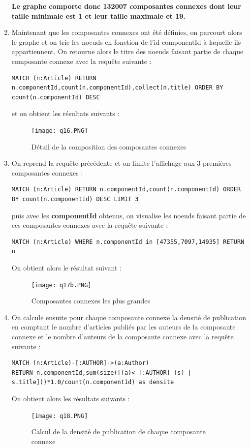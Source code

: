 \documentclass[11pt]{article}
\begin{document}
\begin{enumerate}[resume]
\textbf{Le graphe comporte donc 132007 composantes connexes dont leur taille minimale est 1 et leur taille maximale et 19.}
\item 
Maintenant que les composantes connexes ont été définies, on parcourt alors le graphe et on trie les noeuds en fonction de l'id componentId à laquelle ils appartiennent. On retourne alors le titre des noeuds faisant partie de chaque composante connexe avec la requête suivante :
\begin{lstlisting}
MATCH (n:Article) RETURN n.componentId,count(n.componentId),collect(n.title) ORDER BY count(n.componentId) DESC
\end{lstlisting}
et on obtient les résultats suivants :
\begin{figure}[H]
    \centerline{\texttt{[image: q16.PNG]}}
    \caption{Détail de la composition des composantes connexes}
\end{figure}
\item 
On reprend la requête précédente et on limite l'affichage aux 3 premières composantes connexes :
\begin{lstlisting}
MATCH (n:Article) RETURN n.componentId,count(n.componentId) ORDER BY count(n.componentId) DESC LIMIT 3
\end{lstlisting}
puis avec les \textbf{componentId} obtenus, on visualise les noeuds faisant partie de ces composantes connexes avec la requête suivante :
\begin{lstlisting}
MATCH (n:Article) WHERE n.componentId in [47355,7097,14935] RETURN n
\end{lstlisting}
On obtient alors le résultat suivant :
\begin{figure}[H]
    \centerline{\texttt{[image: q17b.PNG]}}
    \caption{Composantes connexes les plus grandes}
\end{figure}
\item 
On calcule ensuite pour chaque composante connexe la densité de publication en comptant le nombre d'articles publiés par les auteurs de la composante connexe et le nombre d'auteurs de la composante connexe avec la requête suivante :
\begin{lstlisting}
MATCH (n:Article)-[:AUTHOR]->(a:Author) 
RETURN n.componentId,sum(size([(a)<-[:AUTHOR]-(s) | s.title]))*1.0/count(n.componentId) as densite
\end{lstlisting}
On obtient alors les résultats suivants :
\begin{figure}[H]
    \centerline{\texttt{[image: q18.PNG]}}
    \caption{Calcul de la densité de publication de chaque composante connexe}

\end{figure}
\end{enumerate}
\end{document}

